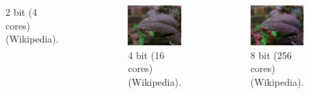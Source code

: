 \begin{frame}[allowframebreaks]
\begin{columns}[T]
\begin{figure}[h!]
    \caption{2 bit (4 cores) (Wikipedia).}
    \label{fig:colordepth-2bit}
    \end{figure}
    \begin{figure}[h!]
    \centering
    \includegraphics[width=\textwidth]{images/colordepth-4bit.png}
    \caption{4 bit (16 cores) (Wikipedia).}
    \label{fig:colordepth-4bit}
    \end{figure}
    \begin{figure}[h!]
    \centering
    \includegraphics[width=\textwidth]{images/colordepth-8bit.png}
    \caption{8 bit (256 cores) (Wikipedia).}
    \label{fig:colordepth-8bit}
    \end{figure} 

\end{columns}
\end{frame}
